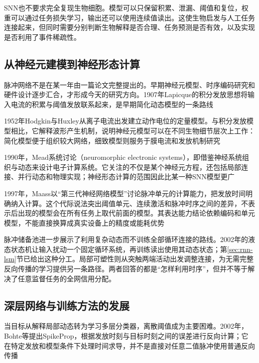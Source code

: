 SNN也不要求完全复现生物细胞。模型可以只保留积累、泄漏、阈值和复位，权重可以通过任务损失学习，输出还可以使用连续值读出。这使生物启发与人工任务连接起来，但同时需要分别判断生物解释是否合理、任务预测是否有效，以及实现是否利用了事件稀疏性。

\subsection{从神经元建模到神经形态计算}
\label{sec:snn-early-history}

脉冲网络不是在某一年由一篇论文完整提出的。早期神经元模型、时序编码研究和硬件设计逐步汇合，才形成今天的研究方向。1907年Lapicque的积分发放思想将输入电流的积累与阈值发放联系起来，是早期简化动态模型的一条路线

1952年Hodgkin与Huxley从离子电流出发建立动作电位的定量模型。与积分发放模型相比，它解释波形产生机制，说明神经元模型可以在不同生物细节层次上工作：简化模型便于组织较大网络，细致模型则服务于膜电流和发放机制研究

1990年，Mead系统讨论（neuromorphic electronic systems），即借鉴神经系统组织与动态来设计电子计算系统。它关注的不仅是某个神经元方程，还包括局部连接、并行动态和物理实现；神经形态计算的范围因此比某一种SNN模型更广

1997年，Maass以“第三代神经网络模型”讨论脉冲单元的计算能力，把发放时间明确纳入计算。这个代际说法突出阈值单元、连续激活和脉冲时序之间的差异，不表示后出现的模型会在所有任务上取代前面的模型。其表达能力结论依赖编码和单元模型，不能直接换算成真实设备上的精度或能耗优势

脉冲储备池进一步展示了利用复杂动态而不训练全部循环连接的路线。2002年的液态状态机让输入扰动一个固定循环系统，再训练读出使用其动态状态；第\ref{sec:rnn-lsm}节已给出这种分工。局部可塑性则从突触两端活动出发调整连接，为无需完整反向传播的学习提供另一条路径。两者回答的都是“怎样利用时序”，但并不等于解决了任意监督任务的全网信用分配。

\subsection{深层网络与训练方法的发展}
\label{sec:snn-learning-history}

当目标从解释局部动态转为学习多层分类器，离散阈值成为主要困难。2002年，Bohte等提出SpikeProp，根据发放时刻与目标时刻之间的误差进行反向计算；它在特定发放和模型条件下处理时间求导，并不是直接对任意二值脉冲使用普通反向传播

